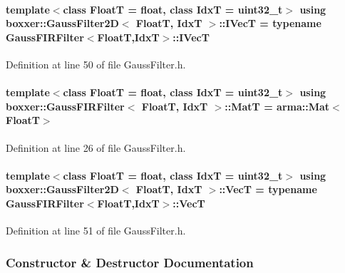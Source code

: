 \paragraph[{\texorpdfstring{I\+VecT}{IVecT}}]{\setlength{\rightskip}{0pt plus 5cm}template$<$class FloatT  = float, class IdxT  = uint32\+\_\+t$>$ using {\bf boxxer\+::\+Gauss\+Filter2D}$<$ FloatT, IdxT $>$\+::{\bf I\+VecT} =  typename {\bf Gauss\+F\+I\+R\+Filter}$<$FloatT,IdxT$>$\+::{\bf I\+VecT}}\hypertarget{classboxxer_1_1GaussFilter2D_a887e8b8aab3bf93d17be4335512e3dfe}{}\label{classboxxer_1_1GaussFilter2D_a887e8b8aab3bf93d17be4335512e3dfe}


Definition at line 50 of file Gauss\+Filter.\+h.

\paragraph[{\texorpdfstring{MatT}{MatT}}]{\setlength{\rightskip}{0pt plus 5cm}template$<$class FloatT = float, class IdxT = uint32\+\_\+t$>$ using {\bf boxxer\+::\+Gauss\+F\+I\+R\+Filter}$<$ FloatT, IdxT $>$\+::{\bf MatT} =  arma\+::\+Mat$<$FloatT$>$\hspace{0.3cm}{\ttfamily [inherited]}}\hypertarget{classboxxer_1_1GaussFIRFilter_a83cf4c7f4782f69918c0e0883fff5412}{}\label{classboxxer_1_1GaussFIRFilter_a83cf4c7f4782f69918c0e0883fff5412}


Definition at line 26 of file Gauss\+Filter.\+h.

\paragraph[{\texorpdfstring{VecT}{VecT}}]{\setlength{\rightskip}{0pt plus 5cm}template$<$class FloatT  = float, class IdxT  = uint32\+\_\+t$>$ using {\bf boxxer\+::\+Gauss\+Filter2D}$<$ FloatT, IdxT $>$\+::{\bf VecT} =  typename {\bf Gauss\+F\+I\+R\+Filter}$<$FloatT,IdxT$>$\+::{\bf VecT}}\hypertarget{classboxxer_1_1GaussFilter2D_a43b1093b492791f308036e6729cf765e}{}\label{classboxxer_1_1GaussFilter2D_a43b1093b492791f308036e6729cf765e}


Definition at line 51 of file Gauss\+Filter.\+h.



\subsubsection{Constructor \& Destructor Documentation}
